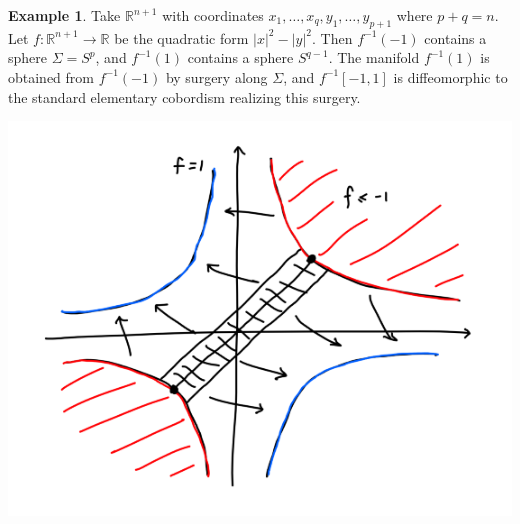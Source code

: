 \documentclass{article}
\theoremstyle{definition}
\newtheorem*{example}{Example}
\newcommand{\R}{\mathbb{R}}
\begin{document}
\begin{example}
    Take $\R^{n+1}$ with coordinates $x_1,\ldots,x_q,y_1,\ldots,y_{p+1}$ where
    $p+q=n$. Let $f:\R^{n+1}\to\R$ be the quadratic form $|x|^2-|y|^2$. Then
    $f^{-1}(-1)$ contains a sphere $\Sigma=S^p$, and $f^{-1}(1)$ contains a
    sphere $S^{q-1}$. The manifold $f^{-1}(1)$ is obtained from $f^{-1}(-1)$ by
    surgery along $\Sigma$, and $f^{-1}[-1,1]$ is diffeomorphic to the standard
    elementary cobordism realizing this surgery.
    \begin{center}
        \includegraphics[scale=0.5]{manifolds_morse1}
    \end{center}
\end{example}
\end{document}
